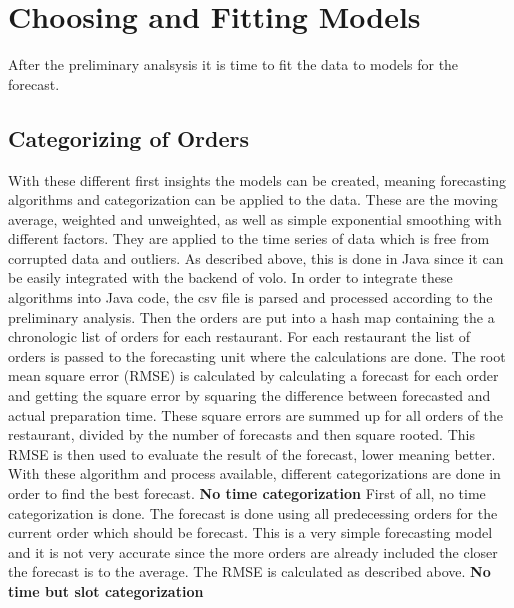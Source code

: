 \section{Choosing and Fitting Models}\label{Choosing and Fitting Models}
After the preliminary analsysis it is time to fit the data to models for the forecast.
\subsection{Categorizing of Orders}\label{subsection:Categorizing by Order}
With these different first insights the models can be created, meaning forecasting algorithms and categorization can be applied to the data. These are the moving average, weighted and unweighted, as well as simple exponential smoothing with different factors. They are applied to the time series of data which is free from corrupted data and outliers. As described above, this is done in Java since it can be easily integrated with the backend of volo.\newline
In order to integrate these algorithms into Java code, the csv file is parsed and processed according to the preliminary analysis. Then the orders are put into a hash map containing the a chronologic list of orders for each restaurant. For each restaurant the list of orders is passed to the forecasting unit where the calculations are done. The root mean square error (RMSE) is calculated by calculating a forecast for each order and getting the square error by squaring the difference between forecasted and actual preparation time. These square errors are summed up for all orders of the restaurant, divided by the number of forecasts and then square rooted. This RMSE is then used to evaluate the result of the forecast, lower meaning better.\newline
With these algorithm and process available, different categorizations are done in order to find the best forecast.
\newline\newline\textbf{No time categorization}\newline
First of all, no time categorization is done. The forecast is done using all predecessing orders for the current order which should be forecast. This is a very simple forecasting model and it is not very accurate since the more orders are already included the closer the forecast is to the average. The RMSE is calculated as described above.
\newline\newline\textbf{No time but slot categorization}\newline
